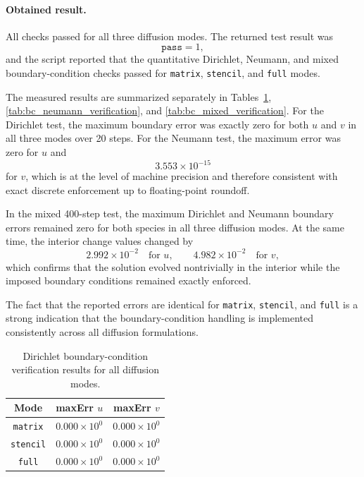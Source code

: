 \paragraph{Obtained result.}
All checks passed for all three diffusion modes. The returned test result was
\[
\texttt{pass} = 1,
\]
and the script reported that the quantitative Dirichlet, Neumann, and mixed boundary-condition checks passed for \texttt{matrix}, \texttt{stencil}, and \texttt{full} modes.

The measured results are summarized separately in Tables~\ref{tab:bc_dirichlet_verification}, \ref{tab:bc_neumann_verification}, and \ref{tab:bc_mixed_verification}. For the Dirichlet test, the maximum boundary error was exactly zero for both \(u\) and \(v\) in all three modes over 20 steps. For the Neumann test, the maximum error was zero for \(u\) and
\[
3.553\times 10^{-15}
\]
for \(v\), which is at the level of machine precision and therefore consistent with exact discrete enforcement up to floating-point roundoff.

In the mixed 400-step test, the maximum Dirichlet and Neumann boundary errors remained zero for both species in all three diffusion modes. At the same time, the interior change values changed by
\[
2.992\times 10^{-2} \quad \text{for } u,
\qquad
4.982\times 10^{-2} \quad \text{for } v,
\]
which confirms that the solution evolved nontrivially in the interior while the imposed boundary conditions remained exactly enforced.

The fact that the reported errors are identical for \texttt{matrix}, \texttt{stencil}, and \texttt{full} is a strong indication that the boundary-condition handling is implemented consistently across all diffusion formulations.

\begin{table}[htbp]
\centering
\caption{Dirichlet boundary-condition verification results for all diffusion modes.}
\label{tab:bc_dirichlet_verification}
\begin{tabular}{|c|c|c|}
\hline
Mode & maxErr \(u\) & maxErr \(v\) \\
\hline
\texttt{matrix}  & \(0.000\times 10^{0}\) & \(0.000\times 10^{0}\) \\
\texttt{stencil} & \(0.000\times 10^{0}\) & \(0.000\times 10^{0}\) \\
\texttt{full}    & \(0.000\times 10^{0}\) & \(0.000\times 10^{0}\) \\
\hline
\end{tabular}
\end{table}

